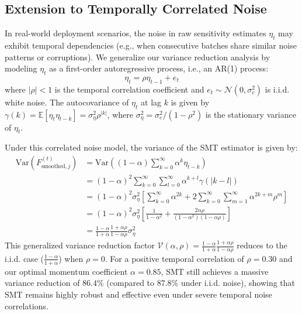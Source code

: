\documentclass{article}
\theoremstyle{plain}
\theoremstyle{definition}
\theoremstyle{remark}
\begin{document}
\subsection{Extension to Temporally Correlated Noise}
In real-world deployment scenarios, the noise in raw sensitivity estimates $\eta_t$ may exhibit temporal dependencies (e.g., when consecutive batches share similar noise patterns or corruptions). We generalize our variance reduction analysis by modeling $\eta_t$ as a first-order autoregressive process, i.e., an AR(1) process:
\begin{equation}
    \eta_t = \rho \eta_{t-1} + e_t
\end{equation}
where $|\rho| < 1$ is the temporal correlation coefficient and $e_t \sim \mathcal{N}(0, \sigma_e^2)$ is i.i.d. white noise. The autocovariance of $\eta_t$ at lag $k$ is given by $\gamma(k) = \mathbb{E}[\eta_t \eta_{t-k}] = \sigma_{\eta}^2 \rho^{|k|}$, where $\sigma_{\eta}^2 = \sigma_e^2 / (1 - \rho^2)$ is the stationary variance of $\eta_t$.

Under this correlated noise model, the variance of the SMT estimator is given by:
\begin{align}
    \text{Var}(F_{\text{smoothed}, j}^{(t)}) &= \text{Var}\left( (1 - \alpha) \sum_{k=0}^{\infty} \alpha^k \eta_{t-k} \right) \\
    &= (1 - \alpha)^2 \sum_{k=0}^{\infty} \sum_{l=0}^{\infty} \alpha^{k+l} \gamma(|k-l|) \\
    &= (1 - \alpha)^2 \sigma_{\eta}^2 \left[ \sum_{k=0}^{\infty} \alpha^{2k} + 2 \sum_{k=0}^{\infty} \sum_{m=1}^{\infty} \alpha^{2k+m} \rho^m \right] \\
    &= (1 - \alpha)^2 \sigma_{\eta}^2 \left[ \frac{1}{1 - \alpha^2} + \frac{2 \alpha \rho}{(1-\alpha^2)(1-\alpha\rho)} \right] \\
    &= \frac{1-\alpha}{1+\alpha} \frac{1 + \alpha\rho}{1 - \alpha\rho} \sigma_{\eta}^2
\end{align}
This generalized variance reduction factor $\mathcal{V}(\alpha, \rho) = \frac{1-\alpha}{1+\alpha} \frac{1 + \alpha\rho}{1 - \alpha\rho}$ reduces to the i.i.d. case ($\frac{1-\alpha}{1+\alpha}$) when $\rho = 0$. For a positive temporal correlation of $\rho = 0.30$ and our optimal momentum coefficient $\alpha = 0.85$, SMT still achieves a massive variance reduction of $86.4\%$ (compared to $87.8\%$ under i.i.d. noise), showing that SMT remains highly robust and effective even under severe temporal noise correlations.
\end{document}
